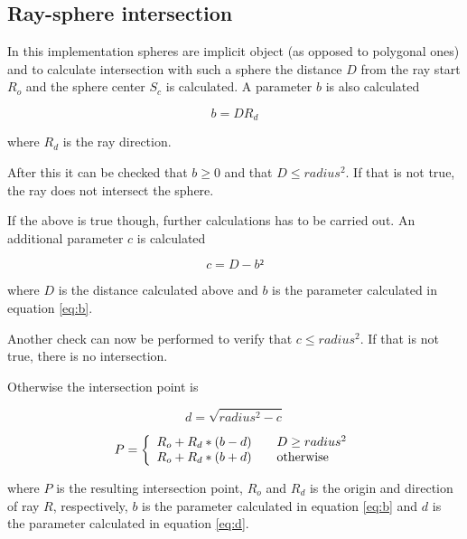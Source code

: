 \documentclass[a4paper]{report}
\begin{document}
\subsection{Ray-sphere intersection}

In this implementation spheres are implicit object (as opposed to
polygonal ones) and to calculate intersection with such a sphere the
distance \(D\) from the ray start \(R_o\) and the sphere center \(S_c\) is
calculated. A parameter \(b\) is also calculated

\begin{equation}
 b = D R_d
 \label{eq:b}
\end{equation}

where \(R_d\) is the ray direction.

After this it can be checked that \(b \geq 0\) and that \(D \leq
radius^2\). If that is not true, the ray does not intersect the
sphere.

If the above is true though, further calculations has to be carried
out. An additional parameter \(c\) is calculated

\begin{equation}
  c = D - b²
\end{equation}

where \(D\) is the distance calculated above and \(b\) is the
parameter calculated in equation \ref{eq:b}.

Another check can now be performed to verify that \(c \leq radius^2\). If
that is not true, there is no intersection.

Otherwise the intersection point is

\begin{equation}
  d = \sqrt{radius^2 - c}
  \label{eq:d}
\end{equation}

\begin{equation}
  P = \left \{
  \begin{array}{l l}
    R_o + R_d *(b-d) & \quad D \geq radius^2 \\
    R_o + R_d *(b+d) & \quad \text{otherwise} \\
  \end{array} \right.
\end{equation}

where \(P\) is the resulting intersection point, \(R_o\) and \(R_d\)
is the origin and direction of ray \(R\), respectively, \(b\) is the
parameter calculated in equation \ref{eq:b} and \(d\) is the parameter
calculated in equation \ref{eq:d}.
\end{document}
